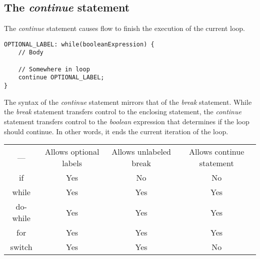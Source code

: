 \documentclass{article}
\begin{document}
\subsection{The \emph{continue} statement}
The \emph{continue} statement causes flow to finish the execution of the current loop.
\begin{lstlisting}
OPTIONAL_LABEL: while(booleanExpression) {
	// Body

	// Somewhere in loop
	continue OPTIONAL_LABEL;
}
\end{lstlisting}
The syntax of the \emph{continue} statement mirrors that of the \emph{break} statement.
While the \emph{break} statement transfers control to the enclosing statement, the \emph{continue} statement transfers control to the \emph{boolean} expression that determines if the loop should continue. In other words, it ends the current iteration of the loop.

\begin{tabular}{|c|c|c|c|}
	\cline{1-4}
	--- & Allows optional labels & Allows unlabeled break & Allows continue statement \\
	\cline{1-4}
	if & Yes & No & No \\
	while & Yes & Yes & Yes \\
	do-while & Yes & Yes & Yes \\
	for & Yes & Yes & Yes \\
	switch & Yes & Yes & No \\
	\cline{1-4}
\end{tabular}
\end{document}
